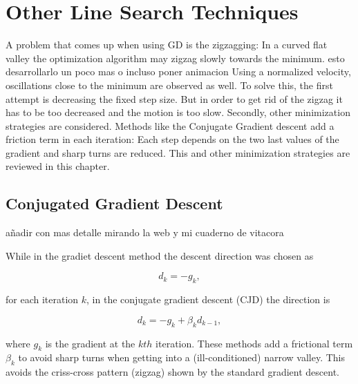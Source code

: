 \section{Other Line Search Techniques}
\label{sec:othermethods}



\label{subsubsec:zigzag}


A problem that comes up when using GD is the zigzagging: In a curved flat valley the optimization algorithm may zigzag slowly towards the minimum. {\color{red} esto desarrollarlo un poco mas o incluso poner animacion} Using a normalized velocity, oscillations close to the minimum are observed as well. 
To solve this, the first attempt is decreasing the fixed step size. But in order to get rid of the zigzag it has to be too decreased and the motion is too slow.
Secondly, other minimization strategies are considered. Methods like the Conjugate Gradient descent add a friction term in each iteration: Each step depends on the two last values of the gradient and sharp turns are reduced. This and other minimization strategies are reviewed in this chapter.



\subsection{Conjugated Gradient Descent}
\label{subsec:CJD}

{\color{red} añadir con mas detalle mirando la web y mi cuaderno de vitacora} 


While in the gradiet descent method the descent direction was chosen as 

\begin{equation}
d_k = -g_k ,
\end{equation} 

for each iteration $k$, in the conjugate gradient descent (CJD) the direction is

\begin{equation}
d_k = -g_k + \beta_k d_{k-1},
\end{equation}

where $g_k$ is the gradient at the $kth$ iteration. These methods add a frictional term $\beta_k$ to avoid sharp turns when getting into a (ill-conditioned) narrow valley. This avoids the criss-cross pattern (zigzag) shown by the standard gradient descent.

